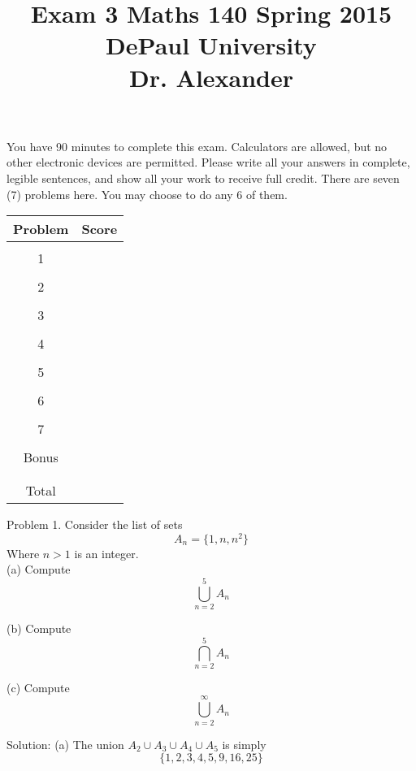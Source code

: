 \documentclass[16 pt]{amsart}
\theoremstyle{definition}
\theoremstyle{remark}
\numberwithin{equation}{subsection}
\begin{document}
\title{Exam 3 Maths 140 Spring 2015 \\ DePaul University\\Dr. Alexander}
\maketitle
You have 90 minutes to complete this exam.  Calculators are allowed, but no other electronic devices are permitted.  Please write all your answers in complete, legible sentences, and show all your work to receive full credit.  There are seven (7) problems here.  You may choose to do any 6 of them.  
\vspace{1in}


\begin{center}
  \begin{tabular}{ c | c }
    Problem & Score\\
    \hline
    &\\
    1&\\
    &\\
    2&\\
    &\\
    3&\\
    &\\
    4&\\
    &\\
    5&\\
    &\\
    6&\\
    &\\
    7&\\
    &\\
    Bonus&\\
    &\\
    \hline 
    &\\    
    Total& 
 \end{tabular}
\end{center}

\newpage 

Problem 1. Consider the list of sets 
\[
A_n = \{1,n,n^2\}
\]
Where $n>1$ is an integer.\\

(a) Compute
\[
\bigcup_{n=2}^{5} A_n
\]

(b) Compute
\[
\bigcap_{n=2}^{5} A_n
\]

(c) Compute
\[
\bigcup_{n=2}^{\infty} A_n
\]

\vspace{1in}

Solution: (a) The union $A_2\cup A_3 \cup A_4\cup A_5$ is simply 
\[
\{1,2,3,4,5,9,16,25\}
\]
\end{document}
